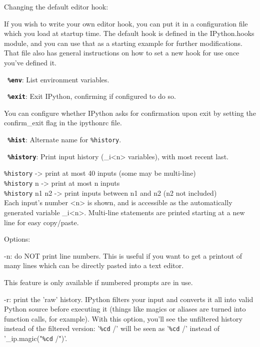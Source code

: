         Changing the default editor hook:

        If you wish to write your own editor hook, you can put it in a
        configuration file which you load at startup time.  The default hook
        is defined in the IPython.hooks module, and you can use that as a
        starting example for further modifications.  That file also has
        general instructions on how to set a new hook for use once you've
        defined it.

\bigskip
\texttt{\textbf{ \%env}}:
	List environment variables.

\bigskip
\texttt{\textbf{ \%exit}}:
	Exit IPython, confirming if configured to do so.

        You can configure whether IPython asks for confirmation upon exit by
        setting the confirm\_exit flag in the ipythonrc file.

\bigskip
\texttt{\textbf{ \%hist}}:
	Alternate name for \texttt{\%history}.

\bigskip
\texttt{\textbf{ \%history}}:
	Print input history (\_i<n> variables), with most recent last.
        
        \texttt{\%history}       -> print at most 40 inputs (some may be multi-line)\\
        \texttt{\%history} n     -> print at most n inputs\\
        \texttt{\%history} n1 n2 -> print inputs between n1 and n2 (n2 not included)\\
        
        Each input's number <n> is shown, and is accessible as the
        automatically generated variable \_i<n>.  Multi-line statements are
        printed starting at a new line for easy copy/paste.
        

        Options:

          -n: do NOT print line numbers.  This is useful if you want to get a
          printout of many lines which can be directly pasted into a text
          editor.

          This feature is only available if numbered prompts are in use.

          -r: print the 'raw' history.  IPython filters your input and
          converts it all into valid Python source before executing it (things
          like magics or aliases are turned into function calls, for
          example).  With this option, you'll see the unfiltered history
          instead of the filtered version: '\texttt{\%cd} /' will be seen as '\texttt{\%cd} /'
          instead of '\_ip.magic("\texttt{\%cd} /")'.
        

